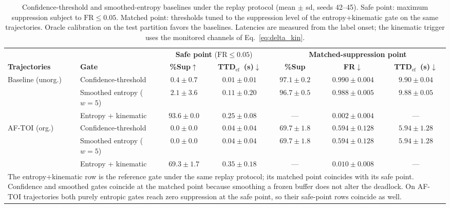 \documentclass[a4paper,fleqn]{cas-dc}
\begin{document}
{\begin{table}[!tbp]
\color{\revcolor}
\centering
\caption{Confidence-threshold and smoothed-entropy baselines under the replay
protocol (mean $\pm$ sd, seeds 42--45). Safe point: maximum suppression
subject to $\mathrm{FR}\le0.05$. Matched point: thresholds tuned to the
suppression level of the entropy+kinematic gate on the same trajectories.
Oracle calibration on the test partition favors the baselines. Latencies are
measured from the label onset; the kinematic trigger uses the monitored
channels of Eq.~\ref{eq:delta_kin}.}
\label{tab:gating_baselines}
\footnotesize
\setlength{\tabcolsep}{5pt}
\renewcommand{\arraystretch}{1.2}
\begin{tabular}{l l c c c c c}
\toprule
& & \multicolumn{2}{c}{\textbf{Safe point} ($\mathrm{FR}\le0.05$)}
  & \multicolumn{3}{c}{\textbf{Matched-suppression point}} \\
\cmidrule(lr){3-4}\cmidrule(lr){5-7}
\textbf{Trajectories} & \textbf{Gate}
  & \textbf{\%Sup}$\uparrow$ & \textbf{TTD$_{\mathrm{ef}}$~(s)}$\downarrow$
  & \textbf{\%Sup} & \textbf{FR}$\downarrow$ & \textbf{TTD$_{\mathrm{ef}}$~(s)}$\downarrow$ \\
\midrule
\multirow{3}{*}{Baseline (unorg.)}
 & Confidence-threshold        & $0.4 \pm 0.7$  & $0.01 \pm 0.01$ & $97.1 \pm 0.2$ & $0.990 \pm 0.004$ & $9.90 \pm 0.04$ \\
 & Smoothed entropy ($w{=}5$)  & $2.1 \pm 3.6$  & $0.11 \pm 0.20$ & $96.7 \pm 0.5$ & $0.988 \pm 0.005$ & $9.88 \pm 0.05$ \\
 & Entropy + kinematic         & $\mathbf{93.6 \pm 0.0}$ & $0.25 \pm 0.08$ & --- & $\mathbf{0.002 \pm 0.004}$ & --- \\
\midrule
\multirow{3}{*}{\mbox{AF-TOI} (org.)}
 & Confidence-threshold        & $0.0 \pm 0.0$  & $0.04 \pm 0.04$ & $69.7 \pm 1.8$ & $0.594 \pm 0.128$ & $5.94 \pm 1.28$ \\
 & Smoothed entropy ($w{=}5$)  & $0.0 \pm 0.0$  & $0.04 \pm 0.04$ & $69.7 \pm 1.8$ & $0.594 \pm 0.128$ & $5.94 \pm 1.28$ \\
 & Entropy + kinematic         & $\mathbf{69.3 \pm 1.7}$ & $\mathbf{0.35 \pm 0.18}$ & --- & $\mathbf{0.010 \pm 0.008}$ & --- \\
\bottomrule
\multicolumn{7}{p{0.93\textwidth}}{\footnotesize The entropy+kinematic row is
the reference gate under the same replay protocol; its matched point coincides
with its safe point. Confidence and smoothed gates coincide at the matched
point because smoothing a frozen buffer does not alter the deadlock. On
\mbox{AF-TOI} trajectories both purely entropic gates reach zero suppression
at the safe point, so their safe-point rows coincide as well.}
\end{tabular}
\end{table}

}
\end{document}
